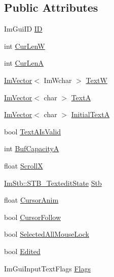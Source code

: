 \subsection*{Public Attributes}
\begin{DoxyCompactItemize}
\item 
Im\+Gui\+ID \hyperlink{structImGuiInputTextState_a919642a77fb872cab950a011877c092b}{ID}
\item 
int \hyperlink{structImGuiInputTextState_a5e0304d69cd5fa3fab05a1fd7b991375}{Cur\+LenW}
\item 
int \hyperlink{structImGuiInputTextState_abdba2cb00ac67ee3464c469d7ada163b}{Cur\+LenA}
\item 
\hyperlink{structImVector}{Im\+Vector}$<$ Im\+Wchar $>$ \hyperlink{structImGuiInputTextState_ad49ccde379925fb4238dcfa308aab418}{TextW}
\item 
\hyperlink{structImVector}{Im\+Vector}$<$ char $>$ \hyperlink{structImGuiInputTextState_ac206ad70804e4ea3db983fe8a558c5dc}{TextA}
\item 
\hyperlink{structImVector}{Im\+Vector}$<$ char $>$ \hyperlink{structImGuiInputTextState_ae0de344794e316aec169edfb3e76e552}{Initial\+TextA}
\item 
bool \hyperlink{structImGuiInputTextState_ac9fd681d8bb37d77b6b4ee9f58b779b5}{Text\+A\+Is\+Valid}
\item 
int \hyperlink{structImGuiInputTextState_a0dcf0134962cfb09d085f14538a59dac}{Buf\+CapacityA}
\item 
float \hyperlink{structImGuiInputTextState_a730a350758ad428d845d895f85770b7f}{ScrollX}
\item 
\hyperlink{structImStb_1_1STB__TexteditState}{Im\+Stb\+::\+S\+T\+B\+\_\+\+Textedit\+State} \hyperlink{structImGuiInputTextState_a60c8aa1efca5c77f73aee5cdd27c68b9}{Stb}
\item 
float \hyperlink{structImGuiInputTextState_a95520b8289da18da2ca6480a64894516}{Cursor\+Anim}
\item 
bool \hyperlink{structImGuiInputTextState_a8cfd858a20e7154e235cc6288fdae6f0}{Cursor\+Follow}
\item 
bool \hyperlink{structImGuiInputTextState_a3ea23fdc7d6cc4983230055ba92bc422}{Selected\+All\+Mouse\+Lock}
\item 
bool \hyperlink{structImGuiInputTextState_af1fb8309908443c5d892a635d03a317e}{Edited}
\item 
Im\+Gui\+Input\+Text\+Flags \hyperlink{structImGuiInputTextState_a3753c19d56d0e7db97df938719594c38}{Flags}
\end{DoxyCompactItemize}


